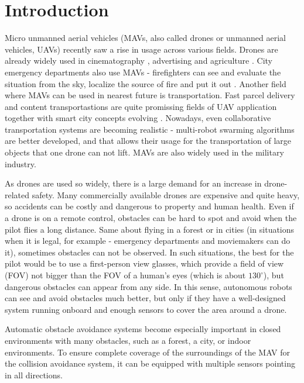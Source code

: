 \chapter{Introduction}

\label{chapter:intro}

Micro unmanned aerial vehicles (MAVs, also called drones or unmanned aerial vehicles, UAVs) recently saw a rise in usage across various fields. 
Drones are already widely used in cinematography \cite{Mademlis2020}, advertising \cite{Ullah2021} and agriculture \cite{Kim2019}. 
City emergency departments also use MAVs - firefighters can see and evaluate the situation from the sky, localize the source of fire and put it out \cite{Pritzl2021}.
Another field where MAVs can be used in nearest future is transportation. 
Fast parcel delivery \cite{She2021} and content transportastions \cite{Gupta2021,Aloqaily2022} are quite promissing fields of UAV application together with smart city concepts evolving \cite{Ortiz2019}.
Nowadays, even collaborative transportation systems are becoming realistic - multi-robot swarming algorithms are better developed, and that allows their usage for the transportation of large objects \cite{Bacelar2020} that one drone can not lift. 
MAVs are also widely used in the military industry.

As drones are used so widely, there is a large demand for an increase in drone-related safety. 
Many commercially available drones are expensive and quite heavy, so accidents can be costly and dangerous to property and human health. 
Even if a drone is on a remote control, obstacles can be hard to spot and avoid when the pilot flies a long distance.
Same about flying in a forest or in cities (in situations when it is legal, for example - emergency departments and moviemakers can do it), sometimes obstacles can not be observed.
In such situations, the best for the pilot would be to use a first-person view glasses, which provide a field of view (FOV) not bigger than the FOV of a human's eyes (which is about $130^\circ$), but dangerous obstacles can appear from any side.
In this sense, autonomous robots can see and avoid obstacles much better, but only if they have a well-designed system running onboard and enough sensors to cover the area around a drone.

Automatic obstacle avoidance systems become especially important in closed environments with many obstacles, such as a forest, a city, or indoor environments.
To ensure complete coverage of the surroundings of the MAV for the collision avoidance system, it can be equipped with multiple sensors pointing in all directions.

